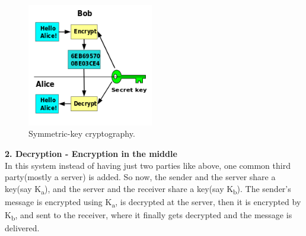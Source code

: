 \documentclass[12 pt]{article}
\begin{document}
\begin{figure}[h!]
  \includegraphics[width=55mm]{Symmetric_key_encryption.png}
  \centering
  \caption{Symmetric-key cryptography.}
  \label{fig:boat1}
\end{figure}
\noindent
\textbf{2. Decryption - Encryption in the middle}
\\In this system instead of having just two parties like above, one common third party(mostly a server) is added. So now, the sender and the server share a key(say K\textsubscript{a}), and the server and the receiver share a key(say K\textsubscript{b}). The sender's message is encrypted using K\textsubscript{a}, is decrypted at the server, then it is encrypted by K\textsubscript{b}, and sent to the receiver, where it finally gets decrypted and the message is delivered.
\end{document}
